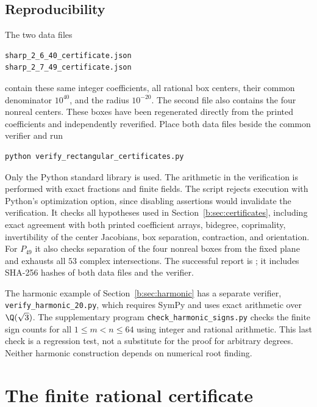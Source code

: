 \documentclass[UTF8,11pt]{ctexart}
\theoremstyle{definition}
\numberwithin{equation}{section}
\begin{document}
\subsection*{Reproducibility}
The two data files
\begin{verbatim}
sharp_2_6_40_certificate.json
sharp_2_7_49_certificate.json
\end{verbatim}
contain these same integer coefficients, all rational box centers,
their common denominator $10^{40}$, and the radius $10^{-20}$.
The second file also contains the four nonreal centers.
These boxes have been regenerated directly from the printed
coefficients and independently reverified. Place both data files
beside the common verifier and run
\begin{verbatim}
python verify_rectangular_certificates.py
\end{verbatim}
Only the Python standard library is used. The arithmetic in the
verification is performed with exact fractions and finite fields.
The script rejects execution with Python's optimization option,
since disabling assertions would invalidate the verification.
It checks all hypotheses used in Section~\ref{b:sec:certificates},
including exact agreement with both printed coefficient arrays,
bidegree, coprimality, invertibility of the center Jacobians,
box separation, contraction, and orientation. For $P_{49}$ it
also checks separation of the four nonreal boxes from the fixed
plane and exhausts all $53$ complex intersections.
The successful report is
; it includes
SHA-256 hashes of both data files and the verifier.

The harmonic example of Section~\ref{b:sec:harmonic} has a separate
verifier, \nolinkurl{verify_harmonic_20.py}, which requires SymPy and
uses exact arithmetic over $\Q(\sqrt3)$. The supplementary program
\nolinkurl{check_harmonic_signs.py} checks the finite sign counts for
all $1\le m<n\le64$ using integer and rational arithmetic. This last
check is a regression test, not a substitute for the proof for
arbitrary degrees. Neither harmonic construction depends on
numerical root finding.

\section{The finite rational certificate}\label{d:app:certificate}
\end{document}
